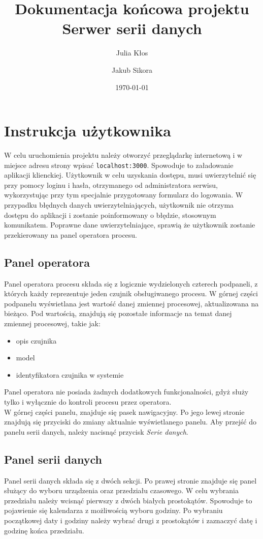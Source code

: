 \documentclass{article}
\title{\LARGE{Dokumentacja końcowa projektu} \\ \Large{Serwer serii danych}}
\author{Julia Kłos \and Jakub Sikora}
\date{\today}
\begin{document}
\maketitle

\section{Instrukcja użytkownika}
W celu uruchomienia projektu należy otworzyć przeglądarkę internetową i 
w miejsce adresu strony wpisać \texttt{localhost:3000}. Spowoduje to załadowanie
aplikacji klienckiej. Użytkownik w celu uzyskania dostępu, musi uwierzytelnić się
przy pomocy loginu i hasła, otrzymanego od administratora serwisu, wykorzystując przy 
tym specjalnie przygotowany formularz do logowania. W przypadku błędnych danych
uwierzytelniających, użytkownik nie otrzyma dostępu do aplikacji i zostanie 
poinformowany o błędzie, stosownym komunikatem. Poprawne dane uwierzytelniające, sprawią
że użytkownik zostanie przekierowany na panel operatora procesu.\\


\subsection{Panel operatora}
Panel operatora procesu składa się z logicznie wydzielonych czterech podpaneli, z których
każdy reprezentuje jeden czujnik obsługiwanego procesu. W górnej części podpanelu wyświetlana
jest wartość danej zmiennej procesowej, aktualizowana na bieżąco. Pod wartością, znajdują się 
pozostałe informacje na temat danej zmiennej procesowej, takie jak: 
\begin{itemize}
    \item opis czujnika
    \item model 
    \item identyfikatora czujnika w systemie
\end{itemize}

Panel operatora nie posiada żadnych dodatkowych funkcjonalności, gdyż służy tylko i wyłącznie
do kontroli procesu przez operatora.\\

W górnej części panelu, znajduje się pasek nawigacyjny. Po jego lewej stronie znajdują się 
przyciski do zmiany aktualnie wyświetlanego panelu. Aby przejść do panelu serii danych, należy
nacisnąć przycisk \textit{Serie danych}.\\

\subsection{Panel serii danych}
Panel serii danych składa się z dwóch sekcji. Po prawej stronie znajduje się panel służący do wyboru
urządzenia oraz przedziału czasowego. W celu wybrania przedziału należy wcisnąć pierwszy z dwóch
białych prostokątów. Spowoduje to pojawienie się kalendarza z możliwością wyboru godziny. Po wybraniu
początkowej daty i godziny należy wybrać drugi z prostokątów i zaznaczyć datę i godzinę końca przedziału.\\
\end{document}
